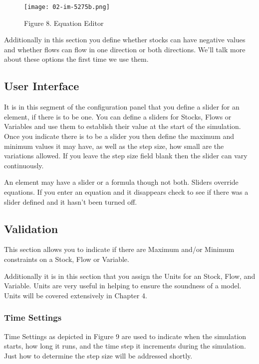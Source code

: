 \documentclass[]{memoir}
\makeatletter
\def\maxwidth{\ifdim\Gin@nat@width>\linewidth\linewidth
\else\Gin@nat@width\fi}
\let\Oldincludegraphics\includegraphics
\renewcommand{\includegraphics}[1]{\Oldincludegraphics[width=\maxwidth]{#1}}
\makeatother
\begin{document}
\begin{figure}[htbp]
\centering
\texttt{[image: 02-im-5275b.png]}
\caption{Figure 8. Equation Editor}
\end{figure}

Additionally in this section you define whether stocks can have negative
values and whether flows can flow in one direction or both directions.
We'll talk more about these options the first time we use them.

\subsection{User Interface}

It is in this segment of the configuration panel that you define a
slider for an element, if there is to be one. You can define a sliders
for Stocks, Flows or Variables and use them to establish their value at
the start of the simulation. Once you indicate there is to be a slider
you then define the maximum and minimum values it may have, as well as
the step size, how small are the variations allowed. If you leave the
step size field blank then the slider can vary continuously.

An element may have a slider or a formula though not both. Sliders
override equations. If you enter an equation and it disappears check to
see if there was a slider defined and it hasn't been turned off.

\subsection{Validation}

This section allows you to indicate if there are Maximum and/or Minimum
constraints on a Stock, Flow or Variable.

Additionally it is in this section that you assign the Units for an
Stock, Flow, and Variable. Units are very useful in helping to ensure
the soundness of a model. Units will be covered extensively in Chapter
4.

\subsubsection{Time Settings}

Time Settings as depicted in Figure 9 are used to indicate when the
simulation starts, how long it runs, and the time step it increments
during the simulation. Just how to determine the step size will be
addressed shortly.
\end{document}
